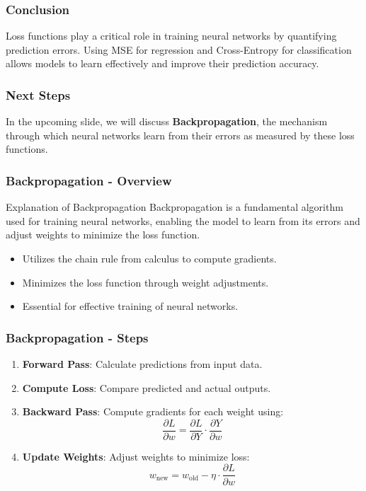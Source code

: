 \documentclass[aspectratio=169]{beamer}
\begin{document}
\begin{frame}[fragile]
  \frametitle{Conclusion}
  Loss functions play a critical role in training neural networks by quantifying prediction errors. Using MSE for regression and Cross-Entropy for classification allows models to learn effectively and improve their prediction accuracy.
\end{frame}

\begin{frame}[fragile]
  \frametitle{Next Steps}
  In the upcoming slide, we will discuss \textbf{Backpropagation}, the mechanism through which neural networks learn from their errors as measured by these loss functions.
\end{frame}

\begin{frame}[fragile]
  \frametitle{Backpropagation - Overview}
  \begin{block}{Explanation of Backpropagation}
      Backpropagation is a fundamental algorithm used for training neural networks, enabling the model to learn from its errors and adjust weights to minimize the loss function.
  \end{block}
  
  \begin{itemize}
      \item Utilizes the chain rule from calculus to compute gradients.
      \item Minimizes the loss function through weight adjustments.
      \item Essential for effective training of neural networks.
  \end{itemize}
\end{frame}

\begin{frame}[fragile]
  \frametitle{Backpropagation - Steps}
  \begin{enumerate}
      \item \textbf{Forward Pass}: Calculate predictions from input data.
      \item \textbf{Compute Loss}: Compare predicted and actual outputs.
      \item \textbf{Backward Pass}: Compute gradients for each weight using:
      \begin{equation}
      \frac{\partial L}{\partial w} = \frac{\partial L}{\partial Y} \cdot \frac{\partial Y}{\partial w}
      \end{equation}
      \item \textbf{Update Weights}: Adjust weights to minimize loss:
      \begin{equation}
      w_{\text{new}} = w_{\text{old}} - \eta \cdot \frac{\partial L}{\partial w}
      \end{equation}
  \end{enumerate}
\end{frame}
\end{document}
